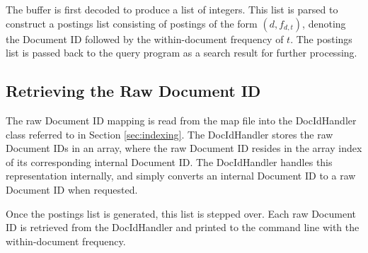 The buffer is first decoded to produce a list of integers. This list is parsed to construct a postings list consisting of postings of the form $(d, f_{d,t})$, denoting the Document ID followed by the within-document frequency of $t$. The postings list is passed back to the query program as a search result for further processing.

\subsection*{Retrieving the Raw Document ID}

The raw Document ID mapping is read from the map file into the DocIdHandler class referred to in Section \ref{sec:indexing}. The DocIdHandler stores the raw Document IDs in an array, where the raw Document ID resides in the array index of its corresponding internal Document ID. The DocIdHandler handles this representation internally, and simply converts an internal Document ID to a raw Document ID when requested.

Once the postings list is generated, this list is stepped over. Each raw Document ID is retrieved from the DocIdHandler and printed to the command line with the within-document frequency.

